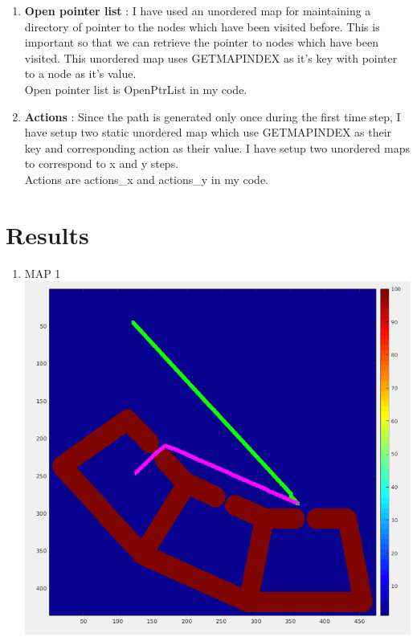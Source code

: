 \documentclass[12pt]{article}
\begin{document}
\begin{enumerate}
    \item \textbf{Open pointer list} : I have used an unordered map for maintaining a directory of pointer to the nodes which have been visited before. This is important so that we can retrieve the pointer to nodes which have been visited. This unordered map uses GETMAPINDEX as it's key with pointer to a node as it's value.\\
    Open pointer list is OpenPtrList in my code.
    
    \item \textbf{Actions} : Since the path is generated only once during the first time step, I have setup two static unordered map which use GETMAPINDEX as their key and corresponding action as their value. I have setup two unordered maps to correspond to x and y steps.\\
    Actions are actions\_x and actions\_y in my code.
\end{enumerate}

\section*{Results}
\begin{enumerate}
    \item MAP 1 \\
    \includegraphics[width = 1000]{16782_HW1_fall19_v2/pictures/map3.png}
\end{enumerate}
\end{document}
